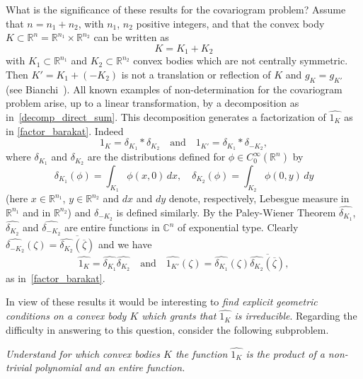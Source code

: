 \documentclass[a4paper]{amsart}
\theoremstyle{definition}
\numberwithin{equation}{section}
\begin{document}
What is the significance of these results for the covariogram problem? Assume that $n=n_1+n_2$, with $n_1$, $n_2$ positive integers, and that the convex body $K\subset{\mathbb{R}}^n={\mathbb{R}}^{n_1}\times{\mathbb{R}}^{n_2}$ can be written as
\begin{equation}\label{decomp_direct_sum}
 K=K_1+K_2
\end{equation}
with $K_1\subset {\mathbb{R}}^{n_1}$ and $K_2\subset{\mathbb{R}}^{n_2}$ convex bodies which are not centrally symmetric.
Then  $K'=K_1+(-K_2)$ is not  a translation or reflection of $K$ and $g_K=g_{K'}$ (see Bianchi~\cite{Bianchi-2009-polytopes}). All known examples of non-determination for the covariogram problem arise, up to a linear transformation, by a decomposition as in~\eqref{decomp_direct_sum}. This decomposition generates a factorization of ${\widehat{{{1_K}}}}$ as in \eqref{factor_barakat}. Indeed
\[
 1_{K}=\delta_{K_1}\ast \delta_{K_2}\quad\text{and}\quad 1_{K'}=\delta_{K_1}\ast \delta_{-{K_2}},
\]
where $\delta_{K_1}$ and ${{\delta}}_{K_2}$ are the distributions defined for $\phi\in C^\infty_0({\mathbb{R}}^{n})$ by
\[
 \delta_{K_1}(\phi)=\int_{K_1} \phi(x,0)\, dx,\quad \delta_{K_2}(\phi)=\int_{K_2} \phi(0,y)\, dy
\]
(here $x\in {\mathbb{R}}^{n_1}$, $y\in{\mathbb{R}}^{n_2}$ and $dx$ and $dy$ denote, respectively, Lebesgue measure in ${\mathbb{R}}^{n_1}$ and in ${\mathbb{R}}^{n_2}$) and ${{\delta}}_{-{K_2}}$ is defined similarly. By the Paley-Wiener Theorem ${\widehat{{{{{\delta}}_{K_1}}}}}$, ${\widehat{{{{{\delta}}_{K_2}}}}}$ and ${\widehat{{{{{\delta}}_{-{K_2}}}}}}$ are entire functions in ${\mathbb{C}}^{n}$ of exponential type. Clearly ${\widehat{{{\delta_{-{K_2}}}}}}({{\zeta}})={\overline{{{\widehat{{{\delta_{K_2}}}}}\left({\overline{{{\zeta}}}}\right)}}}$ and we have
\[
{\widehat{{{1_{K}}}}}={\widehat{{{\delta_{K_1}}}}}{\widehat{{{\delta_{K_2}}}}}\quad\text{and}\quad {\widehat{{{1_{K'}}}}}({{\zeta}})={\widehat{{{\delta_{K_1}}}}}({{\zeta}}) {\overline{{{\widehat{{{\delta_{K_2}}}}}\left({\overline{{{\zeta}}}}\right)}}},
\]
as in~\eqref{factor_barakat}.

In view of these results it would be interesting to \emph{find explicit geometric conditions on a convex body $K$ which grants that ${\widehat{{{1_K}}}}$ is irreducible}. Regarding the difficulty in answering to this question, consider the following subproblem.
\smallskip

\emph{Understand for which convex bodies $K$ the function  ${\widehat{{{1_K}}}}$ is the product of a non-trivial polynomial and an entire function.}
\smallskip
\end{document}
